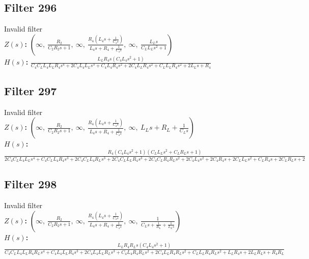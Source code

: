 \documentclass{article}
\begin{document}
\subsection*{Filter 296}
Invalid filter \\ 
\textbf{$Z(s)$:} $\left( \infty, \  \frac{R_{2}}{C_{2} R_{2} s + 1}, \  \infty, \  \frac{R_{4} \left(L_{4} s + \frac{1}{C_{4} s}\right)}{L_{4} s + R_{4} + \frac{1}{C_{4} s}}, \  \infty, \  \frac{L_{L} s}{C_{L} L_{L} s^{2} + 1}\right)$ \\ 
\textbf{$H(s)$:} $\frac{L_{L} R_{4} s \left(C_{4} L_{4} s^{2} + 1\right)}{C_{4} C_{L} L_{4} L_{L} R_{4} s^{4} + 2 C_{4} L_{4} L_{L} s^{3} + C_{4} L_{4} R_{4} s^{2} + 2 C_{4} L_{L} R_{4} s^{2} + C_{L} L_{L} R_{4} s^{2} + 2 L_{L} s + R_{4}}$ \\ 
\subsection*{Filter 297}
Invalid filter \\ 
\textbf{$Z(s)$:} $\left( \infty, \  \frac{R_{2}}{C_{2} R_{2} s + 1}, \  \infty, \  \frac{R_{4} \left(L_{4} s + \frac{1}{C_{4} s}\right)}{L_{4} s + R_{4} + \frac{1}{C_{4} s}}, \  \infty, \  L_{L} s + R_{L} + \frac{1}{C_{L} s}\right)$ \\ 
\textbf{$H(s)$:} $\frac{R_{4} \left(C_{4} L_{4} s^{2} + 1\right) \left(C_{L} L_{L} s^{2} + C_{L} R_{L} s + 1\right)}{2 C_{4} C_{L} L_{4} L_{L} s^{4} + C_{4} C_{L} L_{4} R_{4} s^{3} + 2 C_{4} C_{L} L_{4} R_{L} s^{3} + 2 C_{4} C_{L} L_{L} R_{4} s^{3} + 2 C_{4} C_{L} R_{4} R_{L} s^{2} + 2 C_{4} L_{4} s^{2} + 2 C_{4} R_{4} s + 2 C_{L} L_{L} s^{2} + C_{L} R_{4} s + 2 C_{L} R_{L} s + 2}$ \\ 
\subsection*{Filter 298}
Invalid filter \\ 
\textbf{$Z(s)$:} $\left( \infty, \  \frac{R_{2}}{C_{2} R_{2} s + 1}, \  \infty, \  \frac{R_{4} \left(L_{4} s + \frac{1}{C_{4} s}\right)}{L_{4} s + R_{4} + \frac{1}{C_{4} s}}, \  \infty, \  \frac{1}{C_{L} s + \frac{1}{R_{L}} + \frac{1}{L_{L} s}}\right)$ \\ 
\textbf{$H(s)$:} $\frac{L_{L} R_{4} R_{L} s \left(C_{4} L_{4} s^{2} + 1\right)}{C_{4} C_{L} L_{4} L_{L} R_{4} R_{L} s^{4} + C_{4} L_{4} L_{L} R_{4} s^{3} + 2 C_{4} L_{4} L_{L} R_{L} s^{3} + C_{4} L_{4} R_{4} R_{L} s^{2} + 2 C_{4} L_{L} R_{4} R_{L} s^{2} + C_{L} L_{L} R_{4} R_{L} s^{2} + L_{L} R_{4} s + 2 L_{L} R_{L} s + R_{4} R_{L}}$ \\ 
\end{document}
